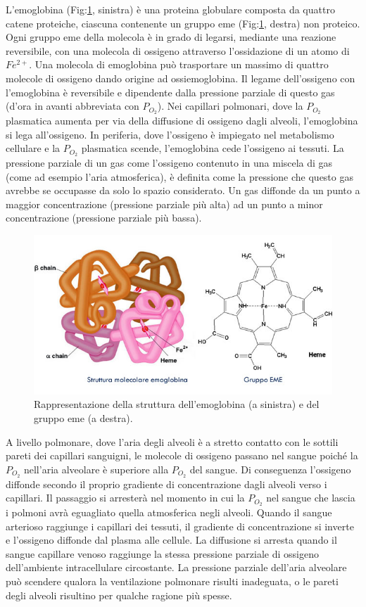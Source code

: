 \documentclass[12pt,a4paper, twoside, openright]{report}
\begin{document}
L'emoglobina (Fig:\ref{fig:Structure}, sinistra) è una proteina globulare composta da quattro catene proteiche, ciascuna contenente un gruppo eme (Fig:\ref{fig:Structure}, destra) non proteico. 
Ogni gruppo eme della molecola è in grado di legarsi, mediante una reazione reversibile, con una molecola di ossigeno attraverso l’ossidazione di un atomo di $Fe^{2+}$. 
Una molecola di emoglobina può trasportare un massimo di quattro molecole di ossigeno dando origine ad ossiemoglobina. 
Il legame dell'ossigeno con l'emoglobina è reversibile e dipendente dalla pressione parziale di questo gas (d'ora in avanti abbreviata con $P_{O_2}$). 
Nei capillari polmonari, dove la $P_{O_2}$ plasmatica aumenta per via della diffusione di ossigeno dagli alveoli, l'emoglobina si lega all'ossigeno. 
In periferia, dove l'ossigeno è impiegato nel metabolismo cellulare e la $P_{O_2}$ plasmatica scende, l'emoglobina cede l'ossigeno ai tessuti. 
La pressione parziale di un gas come l'ossigeno contenuto in una miscela di gas (come ad esempio l'aria atmosferica), è definita come la pressione che questo gas avrebbe se occupasse da solo lo spazio considerato. 
Un gas diffonde da un punto a maggior concentrazione (pressione parziale più alta) ad un punto a minor concentrazione (pressione parziale più bassa). 
\begin{figure}[h!]
    \centering
    \includegraphics[width=\textwidth]{emoglobina-struttura.jpeg}
    \caption{Rappresentazione della struttura dell'emoglobina (a sinistra) e del gruppo 			 eme (a destra).}
    \label{fig:Structure}
\end{figure}
A livello polmonare, dove l'aria degli alveoli è a stretto contatto con le sottili pareti dei capillari sanguigni, le molecole di ossigeno passano nel sangue poiché la $P_{O_2}$ nell'aria alveolare è superiore alla $P_{O_2}$ del sangue. 
Di conseguenza l'ossigeno diffonde secondo il proprio gradiente di concentrazione dagli alveoli verso i capillari. 
Il passaggio si arresterà nel momento in cui la $P_{O_2}$ nel sangue che lascia i polmoni avrà eguagliato quella atmosferica negli alveoli. 
Quando il sangue arterioso raggiunge i capillari dei tessuti, il gradiente di concentrazione si inverte e l'ossigeno diffonde dal plasma alle cellule. 
La diffusione si arresta quando il sangue capillare venoso raggiunge la stessa pressione parziale di ossigeno dell'ambiente intracellulare circostante. 
La pressione parziale dell'aria alveolare può scendere qualora la ventilazione polmonare risulti inadeguata, o le pareti degli alveoli risultino per qualche ragione più spesse.
\end{document}
